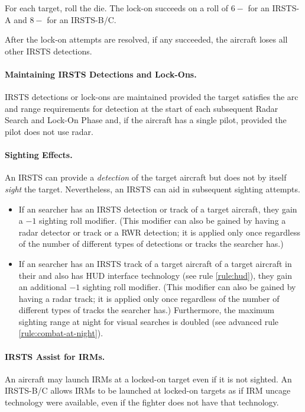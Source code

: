 {\begin{advancedrules}
{For each target, roll the die. The lock-on succeeds on a roll of $6-$ for an IRSTS-A and $8-$ for an IRSTS-B/C. 

After the lock-on attempts are resolved, if any succeeded, the aircraft loses all other IRSTS detections.

\paragraph{Maintaining IRSTS Detections and Lock-Ons.} IRSTS detections or lock-ons are maintained provided the target satisfies the arc and range requirements for detection at the start of each subsequent Radar Search and Lock-On Phase and, if the aircraft has a single pilot, provided the pilot does not use radar.

\paragraph{Sighting Effects.}
An IRSTS can provide a \emph{detection} of the target aircraft but does not by itself \emph{sight} the target. Nevertheless, an IRSTS can aid in subsequent sighting attempts. 

\begin{itemize}
\item If an searcher has an IRSTS detection or track of a target aircraft, they gain a $-1$ sighting roll modifier. (This modifier can also be gained by having a radar detector or track or a RWR detection; it is applied only once regardless of the number of different types of detections or tracks the searcher has.)
\item
If an searcher has an IRSTS track of a target aircraft of a target aircraft in their   and also has HUD interface technology (see rule \ref{rule:hud}), they gain an additional $-1$ sighting roll modifier.  (This modifier can also be gained by having a radar track; it is applied only once regardless of the number of different types of tracks the searcher has.) Furthermore, the maximum sighting range at night for visual searches is doubled (see advanced rule \ref{rule:combat-at-night}).
\end{itemize}

\paragraph{IRSTS Assist for IRMs.} An aircraft may launch IRMs at a locked-on target even if it is not sighted. An IRSTS-B/C allows IRMs to be launched at locked-on targets as if IRM uncage technology were available, even if the fighter does not have that technology.

}

\end{advancedrules}

}

